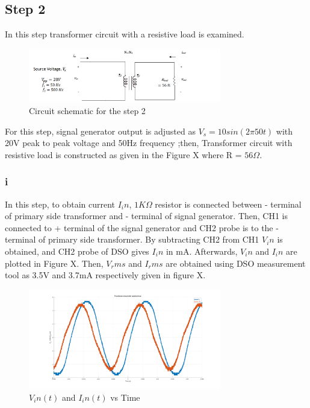\documentclass[letterpaper,12pt]{article}
\begin{document}
%
\subsection{Step 2}
In this step transformer circuit with a resistive load is examined.
\begin{figure}[H]
    \centering
    \includegraphics[width = 0.75\textwidth]{2.png}
    \caption{Circuit schematic for the step 2}
\end{figure} 

For this step, signal generator output is adjusted as \(𝑉_s = 10sin(2\pi50𝑡)\) with 20V peak to peak voltage and 50Hz frequency ;then, Transformer circuit with resistive load is constructed as given in the Figure X where R = \(56\Omega \).  
\subsubsection{i}

In this step, to obtain current \(I_in\), \(1K\Omega \) resistor is connected between - terminal of primary side transformer and - terminal of signal generator. Then, CH1 is connected to + terminal of the signal generator and CH2 probe is to the - terminal of primary side transformer. By subtracting CH2 from CH1 \(V_in\) is obtained, and CH2 probe of DSO gives \(I_in\) in mA. Afterwards, \(V_in\) and \(I_in\) are plotted in Figure X. Then, \(V_rms\) and \(I_rms\) are obtained using DSO measurement tool as 3.5V and 3.7mA respectively given in figure X. 
\begin{figure}[H]
    \centering
    \includegraphics[width = 0.75\textwidth]{2_1.png}
    \caption{\(V_in(t) \) and \(I_in(t)\) vs Time}
\end{figure} 
\end{document}
